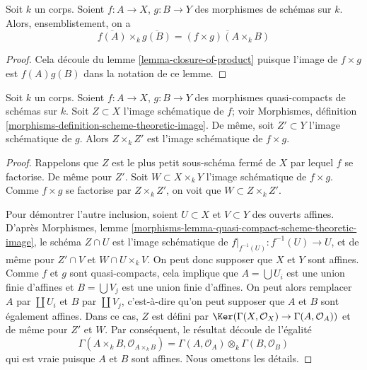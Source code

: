 \begin{lemma}
\label{lemma-closure-image-product-map}
Soit $k$ un corps. Soient $f : A
\to X$, $g : B \to Y$ des morphismes de schémas
sur $k$. Alors, ensemblistement, on a
$$
\overline{f(A)} \times_k \overline{g(B)} =
\overline{(f \times g)(A \times_k B)}
$$
\end{lemma}

\begin{proof}
Cela découle du lemme
\ref{lemma-closure-of-product}
puisque l'image de $f \times g$ est
$f(A)g(B)$ dans la notation de ce lemme.
\end{proof}

\begin{lemma}
\label{lemma-scheme-theoretic-image-product-map}
Soit $k$ un corps. Soient $f : A \to X$, $g
: B \to Y$ des morphismes quasi-compacts de schémas sur
$k$. Soit $Z \subset X$ l'image schématique de $f$;
voir Morphismes, définition
\ref{morphisms-definition-scheme-theoretic-image}. De même, soit $Z' \subset Y$
l'image schématique de $g$. Alors $Z \times_k Z'$ est l'image schématique de $f \times g$.
\end{lemma}

\begin{proof}
Rappelons que $Z$ est le plus petit sous-schéma fermé de $X$ par
lequel $f$ se factorise. De même pour $Z'$. Soit $W \subset X
\times_k Y$ l'image schématique de $f \times g$. Comme $f \times g$ se
factorise par $Z \times_k Z'$, on voit que $W \subset Z \times_k Z'$.

\medskip\noindent
Pour démontrer l'autre inclusion, soient $U \subset X$ et $V
\subset Y$ des ouverts affines. D'après Morphismes, lemme
\ref{morphisms-lemma-quasi-compact-scheme-theoretic-image},
le schéma $Z \cap U$ est l'image schématique de
$f|_{f^{-1}(U)} : f^{-1}(U) \to U$, et de même pour $Z'
\cap V$ et $W \cap U \times_k V$. On peut donc
supposer que $X$ et $Y$ sont affines. Comme $f$ et
$g$ sont quasi-compacts, cela implique que $A = \bigcup
U_i$ est une union finie d'affines et $B = \bigcup V_j$ est
une union finie d'affines. On peut alors remplacer
$A$ par $\coprod U_i$ et $B$ par $\coprod V_j$,
c'est-à-dire qu'on peut supposer que $A$ et $B$ sont
également affines. Dans ce cas, $Z$ est défini par
$\Ker(\Gamma(X, \mathcal{O}_X) \to \Gamma(A, \mathcal{O}_A))$ et de
même pour $Z'$ et $W$. Par conséquent, le résultat découle de l'égalité
$$
\Gamma(A \times_k B, \mathcal{O}_{A \times_k B})
=
\Gamma(A, \mathcal{O}_A) \otimes_k \Gamma(B, \mathcal{O}_B)
$$
qui est vraie puisque $A$ et $B$ sont affines. Nous omettons les détails.
\end{proof}





